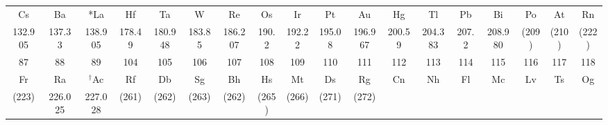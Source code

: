 \documentclass[10pt,landscape]{article}
\begin{document}
\begin{center}
\begin{tabular}{|c*{16}{|c}|c|}
        Cs             & Ba             & *La            & Hf            & Ta             & W             & Re             & Os            & Ir             & Pt            & Au             & Hg            & Tl             & Pb             & Bi             & Po            & At             & Rn                                \\[-2mm]
        \small 132.905 & \small 137.33  & \small 138.905 & \small 178.49 & \small 180.948 & \small 183.85 & \small 186.207 & \small 190.2  & \small 192.22  & \small 195.08 & \small 196.967 & \small 200.59 & \small 204.383 & \small 207.2   & \small 208.980 & \small (209)  & \small (210)   & \small (222)                      \\
        \hline
        \small 87      & \small 88      & \small 89      & \small 104    & \small 105     & \small 106    & \small 107     & \small 108    & \small 109     & \small 110    & \small 111     & \small 112    & \small 113     & \small 114     & \small 115     & \small 116    & \small 117     & \small 118 \tabularnewline [-1mm]
        Fr             & Ra             & $^\dagger$Ac   & Rf            & Db             & Sg            & Bh             & Hs            & Mt             & Ds            & Rg             & Cn            & Nh             & Fl             & Mc             & Lv            & Ts             & Og\tabularnewline [-2mm]
        \small (223)   & \small 226.025 & \small 227.028 & \small (261)  & \small (262)   & \small (263)  & \small (262)   & \small (265)  & \small (266)   & \small (271)  & \small (272)   &               &                &                &                &               &                &                                   \\
    \end{tabular}
\end{center}
\vspace{0.5cm}
\hspace{-0.2cm}
\end{document}
